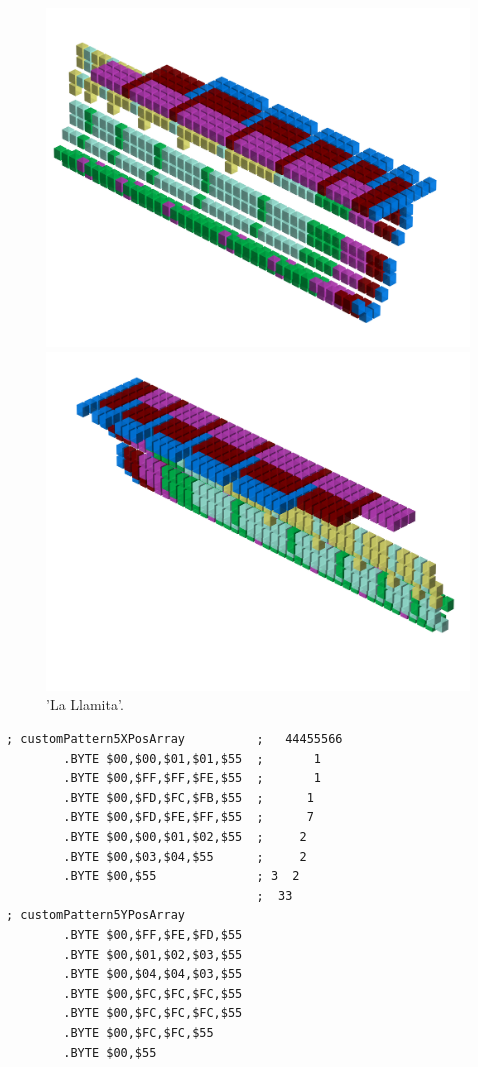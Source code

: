 \begin{figure}[H]
    \centering
    \begin{adjustbox}{width=12cm,center}
      \includegraphics[width=12cm]{src/patterns/pattern13-45.png}%
    \end{adjustbox}
    \begin{adjustbox}{width=12cm,margin=0cm -4cm}
      \includegraphics[width=12cm]{src/patterns/pattern13-225.png}%
    \end{adjustbox}
\caption{'La Llamita'.}
\end{figure}
\clearpage

\begin{lstlisting}
; customPattern5XPosArray          ;   44455566
        .BYTE $00,$00,$01,$01,$55  ;       1   
        .BYTE $00,$FF,$FF,$FE,$55  ;       1   
        .BYTE $00,$FD,$FC,$FB,$55  ;      1    
        .BYTE $00,$FD,$FE,$FF,$55  ;      7    
        .BYTE $00,$00,$01,$02,$55  ;     2     
        .BYTE $00,$03,$04,$55      ;     2     
        .BYTE $00,$55              ; 3  2      
                                   ;  33       
; customPattern5YPosArray
        .BYTE $00,$FF,$FE,$FD,$55
        .BYTE $00,$01,$02,$03,$55
        .BYTE $00,$04,$04,$03,$55
        .BYTE $00,$FC,$FC,$FC,$55
        .BYTE $00,$FC,$FC,$FC,$55
        .BYTE $00,$FC,$FC,$55
        .BYTE $00,$55
\end{lstlisting}


